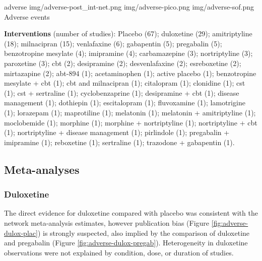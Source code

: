 \documentclass{report}\usepackage[]{graphicx}\usepackage[]{color}
\begin{document}
\soffignew
{adverse}
{img/adverse-post_int-net.png}
{img/adverse-pico.png}
{img/adverse-sof.png}
{Adverse events}

\textbf{Interventions} (number of studies): Placebo (67); duloxetine (29); amitriptyline (18); milnacipran (15); venlafaxine (6); gabapentin (5); pregabalin (5); benzotropine mesylate (4); imipramine (4); carbamazepine (3); nortriptyline (3); paroxetine (3); cbt (2); desipramine (2); desvenlafaxine (2); esreboxetine (2); mirtazapine (2); abt-894 (1); acetaminophen (1); active placebo (1); benzotropine mesylate + cbt (1); cbt and milnacipran (1); citalopram (1); clonidine (1); cst (1); cst + sertraline (1); cyclobenzaprine (1); desipramine + cbt (1); disease management (1); dothiepin (1); escitalopram (1); fluvoxamine (1); lamotrigine (1); lorazepam (1); maprotiline (1); melatonin (1); melatonin + amitriptyline (1); moclobemide (1); morphine (1); morphine + nortriptyline (1); nortriptyline + cbt (1); nortriptyline + disease management (1); pirlindole (1); pregabalin + imipramine (1); reboxetine (1); sertraline (1); trazodone + gabapentin (1).




\subsection{Meta-analyses}

\subsubsection{Duloxetine}

The direct evidence for duloxetine compared with placebo was consistent with the network meta-analysis estimates, however publication bias (Figure \ref{fig:adverse-dulox-plac}) is strongly suspected, also implied by the comparison of duloxetine and pregabalin (Figure \ref{fig:adverse-dulox-pregab}). Heterogeneity in duloxetine observations were not explained by condition, dose, or duration of studies.
\end{document}
